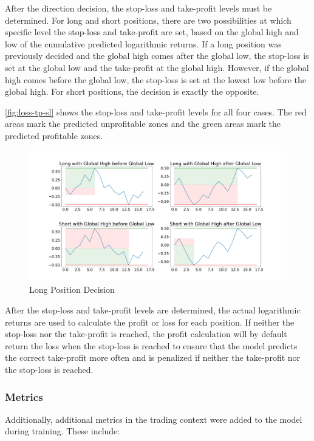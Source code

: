 \noindent
After the direction decision, the stop-loss and take-profit levels must be determined.
For long and short positions, there are two possibilities at which specific level the stop-loss and take-profit are set, based on the global high and low of the cumulative predicted logarithmic returns.
If a long position was previously decided and the global high comes after the global low, the stop-loss is set at the global low and the take-profit at the global high.
However, if the global high comes before the global low, the stop-loss is set at the lowest low before the global high.
For short positions, the decision is exactly the opposite.

\autoref{fig:loss-tp-sl} shows the stop-loss and take-profit levels for all four cases.
The red areas mark the predicted unprofitable zones and the green areas mark the predicted profitable zones.

\begin{figure}[H]
    \centering
    \includegraphics[width=\textwidth]{images/models/loss_tp_sl}
    \caption{Long Position Decision}
    \label{fig:loss-tp-sl}
\end{figure}

\noindent
After the stop-loss and take-profit levels are determined, the actual logarithmic returns are used to calculate the profit or loss for each position.
If neither the stop-loss nor the take-profit is reached, the profit calculation will by default return the loss when the stop-loss is reached to ensure that the model predicts the correct take-profit more often and is penalized if neither the take-profit nor the stop-loss is reached.

\subsubsection{Metrics}

Additionally, additional metrics in the trading context were added to the model during training.
These include:

